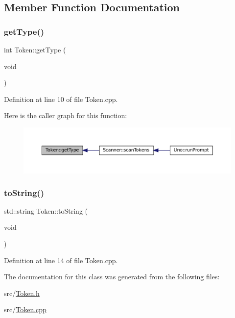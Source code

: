 \subsection{Member Function Documentation}
\mbox{\label{classToken_a7ca73dbe9c27e2663f846293aeaff59c}} 
\subsubsection{\texorpdfstring{get\+Type()}{getType()}}
{\footnotesize\ttfamily int Token\+::get\+Type (\begin{DoxyParamCaption}\item[{void}]{ }\end{DoxyParamCaption})}



Definition at line 10 of file Token.\+cpp.

Here is the caller graph for this function\+:
\nopagebreak
\begin{figure}[H]
\begin{center}
\leavevmode
\includegraphics[width=350pt]{classToken_a7ca73dbe9c27e2663f846293aeaff59c_icgraph}
\end{center}
\end{figure}
\mbox{\label{classToken_ac5f72b7408cc16946d166963cf1f288d}} 
\subsubsection{\texorpdfstring{to\+String()}{toString()}}
{\footnotesize\ttfamily std\+::string Token\+::to\+String (\begin{DoxyParamCaption}\item[{void}]{ }\end{DoxyParamCaption})}



Definition at line 14 of file Token.\+cpp.



The documentation for this class was generated from the following files\+:\begin{DoxyCompactItemize}
\item 
src/\hyperlink{Token_8h}{Token.\+h}\item 
src/\hyperlink{Token_8cpp}{Token.\+cpp}\end{DoxyCompactItemize}
